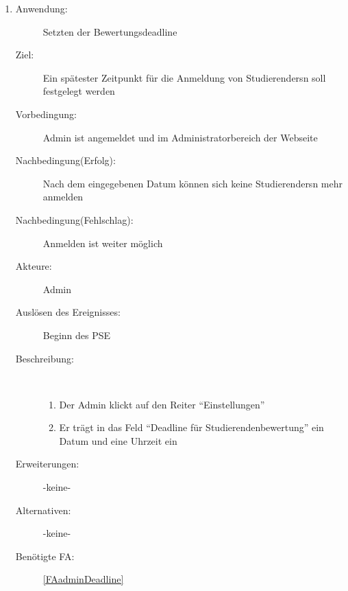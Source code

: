 \documentclass[parskip=full]{scrartcl}
\newcommand{\swtLabel}[1]{\textbf{/#1\arabic*0/}}
\begin{document}
\begin{enumerate} [label=\swtLabel{A}]
	\item \label{UCadminDeadline}
	\begin{description}
		\item[Anwendung:] Setzten der Bewertungsdeadline
		\item[Ziel:] Ein spätester Zeitpunkt für die Anmeldung von \glspl{Studierender}n soll festgelegt werden
		\item[Vorbedingung:] \gls{Admin} ist angemeldet und im Administratorbereich der Webseite
		\item[Nachbedingung(Erfolg):] Nach dem eingegebenen Datum können sich keine \glspl{Studierender}n mehr anmelden
		\item[Nachbedingung(Fehlschlag):] Anmelden ist weiter möglich
		\item[Akteure:] \gls{Admin}
		\item[Auslösen des Ereignisses:] Beginn des \gls{PSE}
		\item[Beschreibung:]~
		\begin{enumerate}[label=\arabic*.]
			\item Der \gls{Admin} klickt auf den Reiter \enquote{Einstellungen}
			\item Er trägt in das Feld \enquote{Deadline für Studierendenbewertung} ein Datum und eine Uhrzeit ein
		\end{enumerate}
		\item[Erweiterungen:] -keine-
		\item[Alternativen:] -keine-
		\item[Benötigte FA:] \ref{FAadminDeadline}
	\end{description}
	

\end{enumerate}
\end{document}
